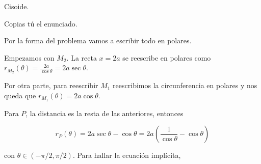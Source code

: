 \begin{problem}[9] Cisoide.

Copias tú el enunciado.

\solution

Por la forma del problema vamos a escribir todo en polares.

Empezamos con $M_2$. La recta $x=2a$ se reescribe en polares como $r_{M_2}(θ) = \frac{2a}{\cos θ} = 2a \sec θ$.

Por otra parte, para reescribir $M_1$ reescribimos la circunferencia en polares y nos queda que $r_{M_1}(θ) = 2a\cos θ$. 

Para $P$, la distancia es la resta de las anteriores, entonces

\[ r_P(θ) = 2a \sec θ - \cos θ = 2a\left(\frac{1}{\cos θ} - \cos θ\right) \]

con $θ∈(-π/2, π/2)$.  Para hallar la ecuación implícita, 

\end{problem}

